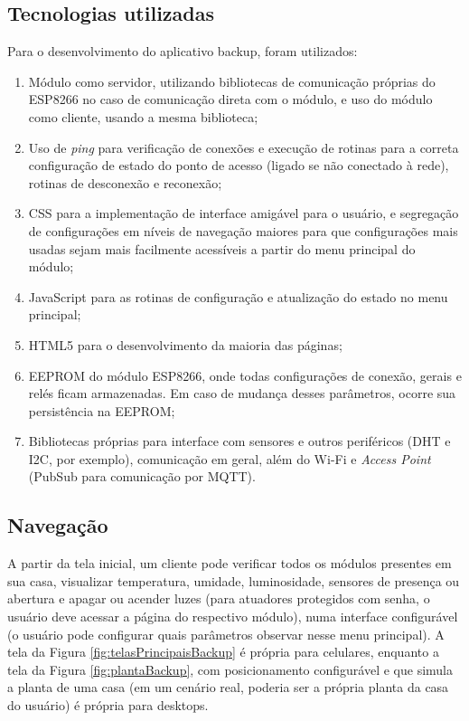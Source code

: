 \subsection{Tecnologias utilizadas}

Para o desenvolvimento do aplicativo backup, foram utilizados:

\begin{enumerate}
	\item Módulo como servidor, utilizando bibliotecas de comunicação próprias do ESP8266 no caso de comunicação direta com o módulo, e uso do módulo como cliente, usando a mesma biblioteca;
	\item Uso de \emph{ping} para verificação de conexões e execução de rotinas para a correta configuração de estado do ponto de acesso (ligado se não conectado à rede), rotinas de desconexão e reconexão;
	\item CSS para a implementação de interface amigável para o usuário, e segregação de configurações em níveis de navegação maiores para que configurações mais usadas sejam mais facilmente acessíveis a partir do menu principal do módulo;
	\item JavaScript para as rotinas de configuração e atualização do estado no menu principal;
	\item HTML5 para o desenvolvimento da maioria das páginas;
	\item EEPROM do módulo ESP8266, onde todas configurações de conexão, gerais e relés ficam armazenadas. Em caso de mudança desses parâmetros, ocorre sua persistência na EEPROM;
	\item Bibliotecas próprias para interface com sensores e outros periféricos (DHT e I2C, por exemplo), comunicação em geral, além do Wi-Fi e \emph{Access Point} (PubSub para comunicação por MQTT).
\end{enumerate}

\subsection{Navegação}

A partir da tela inicial, um cliente pode verificar todos os módulos presentes em sua casa, visualizar temperatura, umidade, luminosidade, sensores de presença ou abertura e apagar ou acender luzes (para atuadores protegidos com senha, o usuário deve acessar a página do respectivo módulo), numa interface configurável (o usuário pode configurar quais parâmetros observar nesse menu principal). A tela da Figura \ref{fig:telasPrincipaisBackup} é própria para celulares, enquanto a tela da Figura \ref{fig:plantaBackup}, com posicionamento configurável e que simula a planta de uma casa (em um cenário real, poderia ser a própria planta da casa do usuário) é própria para desktops.

